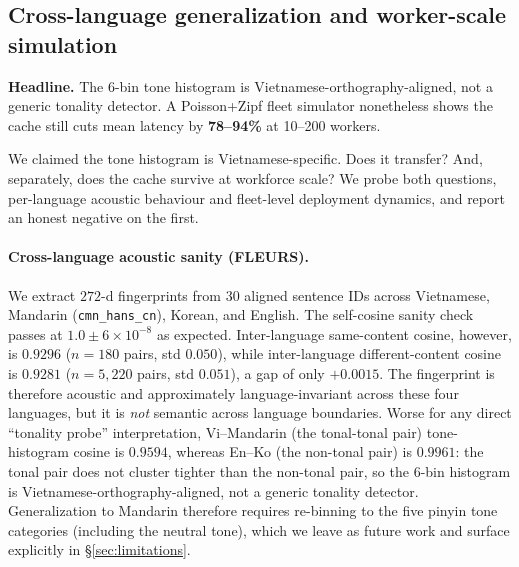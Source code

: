 \documentclass[a4paper,fleqn]{cas-dc}
\begin{document}
\subsection{Cross-language generalization and worker-scale simulation}\label{sec:exp:crossling}
\textbf{Headline.} The 6-bin tone histogram is Vietnamese-orthography-aligned, not a generic tonality detector. A Poisson+Zipf fleet simulator nonetheless shows the cache still cuts mean latency by \textbf{78--94\%} at 10--200 workers.

We claimed the tone histogram is Vietnamese-specific. Does it transfer? And, separately, does the cache survive at workforce scale? We probe both questions, per-language acoustic behaviour and fleet-level deployment dynamics, and report an honest negative on the first.

\paragraph{Cross-language acoustic sanity (FLEURS).} We extract $272$-d fingerprints from $30$ aligned sentence IDs across Vietnamese, Mandarin (\texttt{cmn\_hans\_cn}), Korean, and English. The self-cosine sanity check passes at $1.0 \pm 6 \times 10^{-8}$ as expected. Inter-language same-content cosine, however, is $0.9296$ ($n = 180$ pairs, std $0.050$), while inter-language different-content cosine is $0.9281$ ($n = 5{,}220$ pairs, std $0.051$), a gap of only $+0.0015$. The fingerprint is therefore acoustic and approximately language-invariant across these four languages, but it is \emph{not} semantic across language boundaries. Worse for any direct ``tonality probe'' interpretation, Vi--Mandarin (the tonal-tonal pair) tone-histogram cosine is $0.9594$, whereas En--Ko (the non-tonal pair) is $0.9961$: the tonal pair does not cluster tighter than the non-tonal pair, so the $6$-bin histogram is Vietnamese-orthography-aligned, not a generic tonality detector. Generalization to Mandarin therefore requires re-binning to the five pinyin tone categories (including the neutral tone), which we leave as future work and surface explicitly in \S\ref{sec:limitations}.
\end{document}
